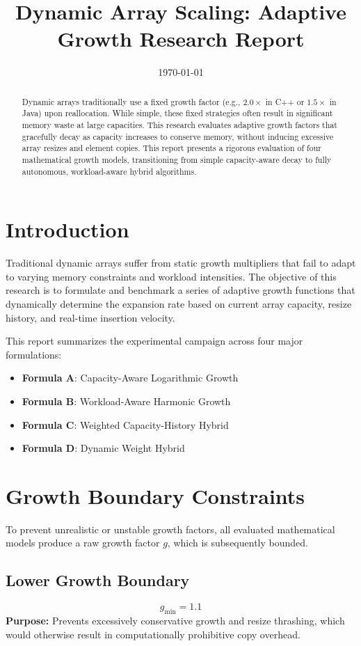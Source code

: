 \documentclass{article}
\title{Dynamic Array Scaling: Adaptive Growth Research Report}
\author{}
\date{\today}
\begin{document}
\maketitle

\begin{abstract}
Dynamic arrays traditionally use a fixed growth factor (e.g., $2.0\times$ in C++ or $1.5\times$ in Java) upon reallocation. While simple, these fixed strategies often result in significant memory waste at large capacities. This research evaluates adaptive growth factors that gracefully decay as capacity increases to conserve memory, without inducing excessive array resizes and element copies. This report presents a rigorous evaluation of four mathematical growth models, transitioning from simple capacity-aware decay to fully autonomous, workload-aware hybrid algorithms.
\end{abstract}

\section{Introduction}
Traditional dynamic arrays suffer from static growth multipliers that fail to adapt to varying memory constraints and workload intensities. The objective of this research is to formulate and benchmark a series of adaptive growth functions that dynamically determine the expansion rate based on current array capacity, resize history, and real-time insertion velocity.

This report summarizes the experimental campaign across four major formulations:
\begin{itemize}
    \item \textbf{Formula A}: Capacity-Aware Logarithmic Growth
    \item \textbf{Formula B}: Workload-Aware Harmonic Growth
    \item \textbf{Formula C}: Weighted Capacity-History Hybrid
    \item \textbf{Formula D}: Dynamic Weight Hybrid
\end{itemize}

\section{Growth Boundary Constraints}
To prevent unrealistic or unstable growth factors, all evaluated mathematical models produce a raw growth factor $g$, which is subsequently bounded.

\subsection{Lower Growth Boundary}
\begin{equation}
g_{\min} = 1.1
\end{equation}
\textbf{Purpose:} Prevents excessively conservative growth and resize thrashing, which would otherwise result in computationally prohibitive copy overhead.
\end{document}
